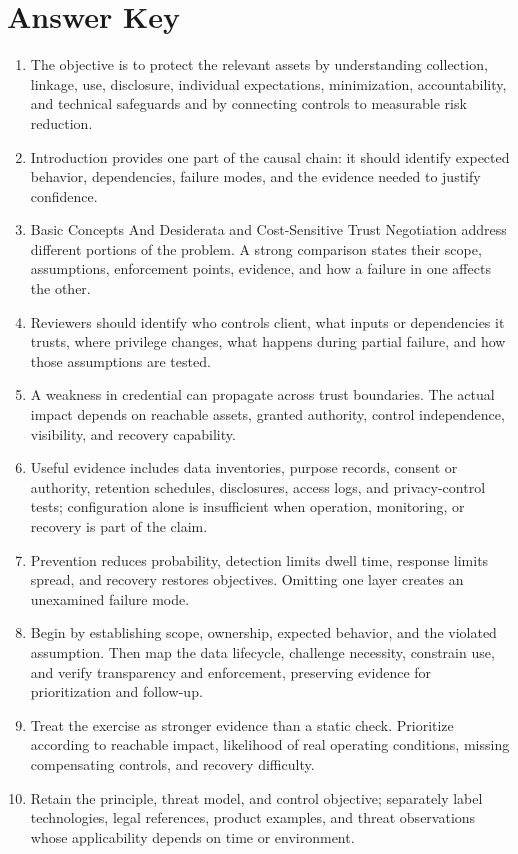 \documentclass[11pt,letterpaper]{article}
\begin{document}
\section*{Answer Key}
\begin{enumerate}
\item The objective is to protect the relevant assets by understanding collection, linkage, use, disclosure, individual expectations, minimization, accountability, and technical safeguards and by connecting controls to measurable risk reduction.
\item Introduction provides one part of the causal chain: it should identify expected behavior, dependencies, failure modes, and the evidence needed to justify confidence.
\item Basic Concepts And Desiderata and Cost-Sensitive Trust Negotiation address different portions of the problem. A strong comparison states their scope, assumptions, enforcement points, evidence, and how a failure in one affects the other.
\item Reviewers should identify who controls client, what inputs or dependencies it trusts, where privilege changes, what happens during partial failure, and how those assumptions are tested.
\item A weakness in credential can propagate across trust boundaries. The actual impact depends on reachable assets, granted authority, control independence, visibility, and recovery capability.
\item Useful evidence includes data inventories, purpose records, consent or authority, retention schedules, disclosures, access logs, and privacy-control tests; configuration alone is insufficient when operation, monitoring, or recovery is part of the claim.
\item Prevention reduces probability, detection limits dwell time, response limits spread, and recovery restores objectives. Omitting one layer creates an unexamined failure mode.
\item Begin by establishing scope, ownership, expected behavior, and the violated assumption. Then map the data lifecycle, challenge necessity, constrain use, and verify transparency and enforcement, preserving evidence for prioritization and follow-up.
\item Treat the exercise as stronger evidence than a static check. Prioritize according to reachable impact, likelihood of real operating conditions, missing compensating controls, and recovery difficulty.
\item Retain the principle, threat model, and control objective; separately label technologies, legal references, product examples, and threat observations whose applicability depends on time or environment.
\end{enumerate}
\end{document}
